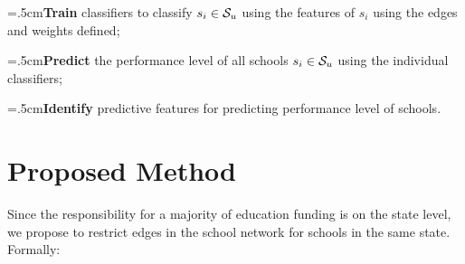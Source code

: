 \noindent\hangindent=.5cm\textbf{Train} classifiers to classify $s_i \in \mathcal{S}_u$ using the features of $s_i$ using the edges and weights defined; 

\noindent\hangindent=.5cm\textbf{Predict} the performance level of all schools $s_i \in \mathcal{S}_u$ using the individual classifiers;

\noindent\hangindent=.5cm\textbf{Identify} predictive features for predicting performance level of schools.

\begin{table}
	\caption{Ranges used for reporting percentages.}
	\label{tab:ranges}
\end{table}

\section{Proposed Method} \label{sec:propose}

Since the responsibility for a majority of education funding is on the state level, we propose to restrict edges in the school network for schools in the same state. Formally:


